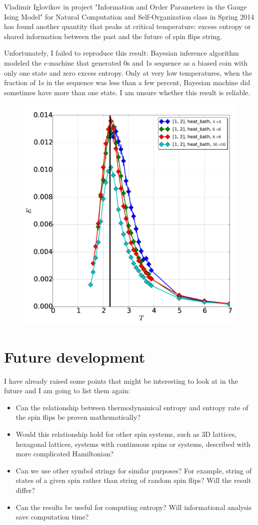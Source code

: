 \documentclass{llncs}
\begin{document}

Vladimir Iglovikov in project "Information and Order Parameters in the Gauge Ising Model" for Natural Computation and Self-Organization class in Spring 2014 has found another quantity that peaks at critical temperature: excess entropy or shared information between the past and the future of spin flips string.

Unfortunately, I failed to reproduce this result: Bayesian inference algorithm modeled the $\epsilon$-machine that generated 0s and 1s sequence as a biased coin with only one state and zero excess entropy. Only at very low temperatures, when the fraction of 1s in the sequence was less than a few percent, Bayesian machine did sometimes have more than one state. I am unsure whether this result is reliable.


\begin{figure}[H]
\includegraphics[width=0.55\linewidth]{vlad.png}
\centering
\end{figure}

%
\section{Future development}
%
I have already raised some points that might be interesting to look at in the future and I am going to list them again:

\begin{itemize}
\item Can the relationship between thermodynamical entropy and entropy rate of the spin flips be proven mathematically?

\item Would this relationship hold for other spin systems, such as 3D lattices, hexagonal lattices, systems with continuous spins or systems, described with more complicated Hamiltonian?

\item Can we use other symbol strings for similar purposes? For example, string of states of a given spin rather than string of random spin flips? Will the result differ?

\item Can the results be useful for computing entropy? Will informational analysis save computation time?

\end{itemize}
\end{document}

